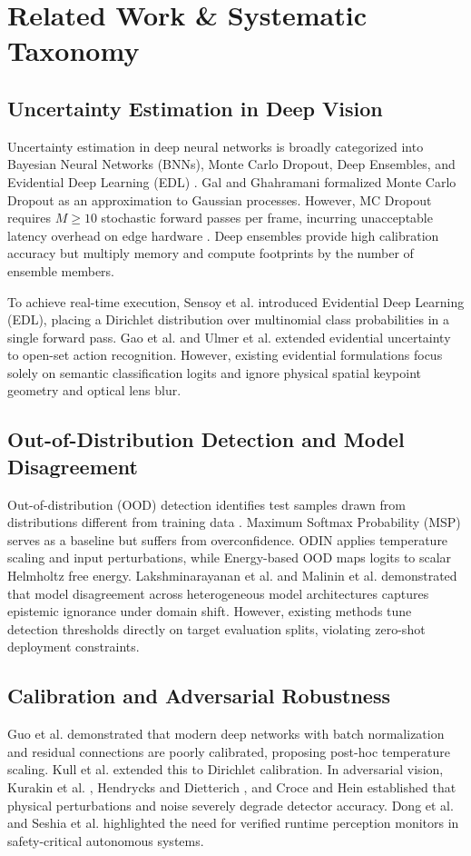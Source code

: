 \documentclass[conference]{IEEEtran}
\begin{document}
\section{Related Work & Systematic Taxonomy}
\subsection{Uncertainty Estimation in Deep Vision}
Uncertainty estimation in deep neural networks is broadly categorized into Bayesian Neural Networks (BNNs), Monte Carlo Dropout, Deep Ensembles, and Evidential Deep Learning (EDL) \cite{b12, b13}. Gal and Ghahramani \cite{b14} formalized Monte Carlo Dropout as an approximation to Gaussian processes. However, MC Dropout requires $M \ge 10$ stochastic forward passes per frame, incurring unacceptable latency overhead on edge hardware \cite{b15}. Deep ensembles \cite{b16} provide high calibration accuracy but multiply memory and compute footprints by the number of ensemble members.

To achieve real-time execution, Sensoy et al. \cite{b17} introduced Evidential Deep Learning (EDL), placing a Dirichlet distribution over multinomial class probabilities in a single forward pass. Gao et al. \cite{b18} and Ulmer et al. \cite{b19} extended evidential uncertainty to open-set action recognition. However, existing evidential formulations focus solely on semantic classification logits and ignore physical spatial keypoint geometry and optical lens blur.

\subsection{Out-of-Distribution Detection and Model Disagreement}
Out-of-distribution (OOD) detection identifies test samples drawn from distributions different from training data \cite{b20, b21}. Maximum Softmax Probability (MSP) \cite{b10} serves as a baseline but suffers from overconfidence. ODIN \cite{b22} applies temperature scaling and input perturbations, while Energy-based OOD \cite{b23} maps logits to scalar Helmholtz free energy. Lakshminarayanan et al. \cite{b16} and Malinin et al. \cite{b24} demonstrated that model disagreement across heterogeneous model architectures captures epistemic ignorance under domain shift. However, existing methods tune detection thresholds directly on target evaluation splits, violating zero-shot deployment constraints.

\subsection{Calibration and Adversarial Robustness}
Guo et al. \cite{b25} demonstrated that modern deep networks with batch normalization and residual connections are poorly calibrated, proposing post-hoc temperature scaling. Kull et al. \cite{b26} extended this to Dirichlet calibration. In adversarial vision, Kurakin et al. \cite{b27}, Hendrycks and Dietterich \cite{b6}, and Croce and Hein \cite{b28} established that physical perturbations and noise severely degrade detector accuracy. Dong et al. \cite{b29} and Seshia et al. \cite{b30} highlighted the need for verified runtime perception monitors in safety-critical autonomous systems.
\end{document}
